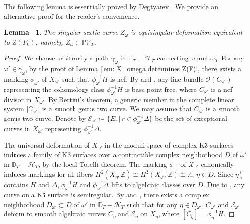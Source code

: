 \documentclass[12pt,reqno,a4paper]{amsart}
\newtheorem{lem}[thm]{Lemma~}
\theoremstyle{remark}
\theoremstyle{definition}
\begin{document}
The following lemma is essentially proved by Degtyarev \cite[Theorem 3.4.1]{degtyarev2008deformations}. We provide an alternative proof for the reader's convenience.
\begin{lem}
\label{lem: Z_omega has type T}
    The singular sextic curve $Z_\omega$ is equisingular deformation equivalent to $Z(F_0)$, namely, $Z_\omega\in \mathbb{P}\mathcal{V}_T$.
\end{lem}
\begin{proof}
    We choose arbitrarily a path $\gamma_\omega$ in $\mathbb{D}_T-\mathcal{H}_T$ connecting $\omega$ and $\omega_0$.
    For any $\omega'\in\gamma_\omega$, by the proof of Lemma \ref{lem: X_omega determines Z(F)}, there exists a marking $\phi_{\omega'}$ of $X_{\omega'}$ such that $\phi_{\omega'}^{-1} H$ is nef.
    By \cite[Proposition 1.7]{urabe1988combinations} and \cite[Chapter 2, \S 3, Corollary 3.14]{huybrechts2016lectures}, any line bundle $\mathcal{O}(C_{\omega'})$ representing the cohomology class $\phi_{\omega'}^{-1} H$ is base point free, where $C_{\omega'}$ is a nef divisor in $X_{\omega'}$.
    By Bertini's theorem, a generic member in the complete linear system $|C_{\omega'}|$ is a smooth genus two curve.
    We may assume that $C_{\omega'}$ is a smooth genus two curve.
    Denote by $\mathcal{E}_{\omega'}\coloneqq\{E_r \,|\, r\in \phi_{\omega'}^{-1} \Delta\}$ be the set of exceptional curves in $X_{\omega'}$ representing $\phi_{\omega'}^{-1} \Delta$.

    The universal deformation of $X_{\omega'}$ in the moduli space of complex K3 surfaces induces a family of K3 surfaces over a contractible complex neighborhood $D$ of $\omega'$ in $\mathbb{D}_T-\mathcal{H}_T$, by the local Torelli theorem.
    The marking $\phi_{\omega'}$ of $X_{\omega'}$ canonically induces markings for all fibers $H^2(X_\eta,\mathbb{Z})\cong H^2(X_{\omega'},\mathbb{Z})\cong\Lambda$, $\eta\in D$.
    Since $\eta^\perp_\Lambda$ contains $H$ and $\Delta$, $\phi_{\omega'}^{-1} H$ and $\phi_{\omega'}^{-1} \Delta$ lifts to algebraic classes over $D$.
    Due to \cite[Page 363]{nishinou2024deformation}, any curve on a K3 surface is semiregular.
    By \cite[Theorem 7.1]{bloch1972semi-regularity} and \cite[Theorem 1.5(i)]{artin1968solutions}, there exists a complex neighborhood $D_{\omega'}\subset D$ of $\omega'$ in $\mathbb{D}_T-\mathcal{H}_T$ such that for any $\eta\in D_{\omega'}$, $C_{\omega'}$ and $\mathcal{E}_{\omega'}$ deform to smooth algebraic curves $C_{\eta}$ and $\mathcal{E}_{\eta}$ on $X_\eta$, where $[C_{\eta}]=\phi_\eta^{-1} H$.


\end{proof}
\end{document}
